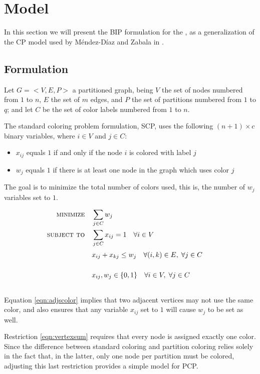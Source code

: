 
\section{Model}
\label{sec:model}

In this section we will present the BIP formulation for the \PCP{}, as a generalization of the CP model used by M\'endez-D\'iaz and Zabala in \cite{mendez2008cutting}.

\subsection{Formulation}
\label{subsec:model:formulation}

Let $G = <V,E,P>$ a partitioned graph, being $V$ the set of nodes numbered from $1$ to $n$, $E$ the set of $m$ edges, and $P$ the set of partitions numbered from $1$ to $q$; and let $C$ be the set of color labels numbered from $1$ to $n$.

The standard coloring problem formulation, SCP, uses the following $(n + 1) \times c$ binary variables, where $i \in V$ and $j \in C$:
\begin{itemize}
\item $x_{ij}$ equals $1$ if and only if the node $i$ is colored with label $j$
\item $w_j$ equals $1$ if there is at least one node in the graph which uses color $j$
\end{itemize}

The goal is to minimize the total number of colors used, this is, the number of $w_j$ variables set to $1$.

\begin{align}
\text{\textsc{minimize}} \quad & \sum_{j \in C} w_j \nonumber \\
\text{\textsc{subject to}} \quad & \sum_{j \in C} x_{ij} = 1 \quad \forall i \in V \label{eqn:vertexsum} \\
& x_{ij} + x_{kj} \leq w_j \quad \forall (i,k) \in E, \; \forall j \in C \sumheight \label{eqn:adjscolor}\\
& x_{ij}, w_{j} \in \{0,1\} \quad \forall i \in V, \; \forall j \in C \sumheight \nonumber
\end{align}

Equation \ref{eqn:adjscolor} implies that two adjacent vertices may not use the same color, and also ensures that any variable $x_{ij}$ set to $1$ will cause $w_j$ to be set as well.

Restriction \ref{eqn:vertexsum} requires that every node is assigned exactly one color. Since the difference between standard coloring and partition coloring relies solely in the fact that, in the latter, only one node per partition must be colored, adjusting this last restriction provides a simple model for PCP.


